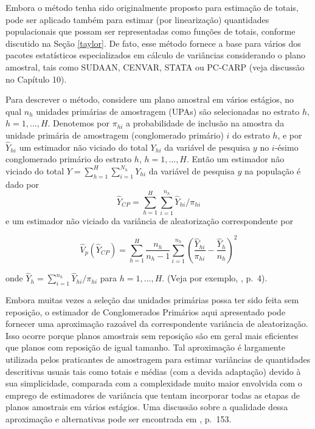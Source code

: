 \documentclass[]{book}
\theoremstyle{definition}
\theoremstyle{definition}
\theoremstyle{definition}
\theoremstyle{remark}
\begin{document}
Embora o método tenha sido originalmente proposto para estimação de
totais, pode ser aplicado também para estimar (por linearização)
quantidades populacionais que possam ser representadas como funções de
totais, conforme discutido na Seção \ref{taylor}. De fato, esse método
fornece a base para vários dos pacotes estatísticos especializados em
cálculo de variâncias considerando o plano amostral, tais como SUDAAN,
CENVAR, STATA ou PC-CARP (veja discussão no Capítulo 10).

Para descrever o método, considere um plano amostral em vários estágios,
no qual \(n_{h}\) unidades primárias de amostragem (UPAs) são
selecionadas no estrato \(h,\) \(h=1,\ldots ,H\). Denotemos por
\(\pi_{hi}\) a probabilidade de inclusão na amostra da unidade primária
de amostragem (conglomerado primário) \(i\) do estrato \(h\), e por
\(\widehat{Y}_{hi}\) um estimador não viciado do total \(Y_{hi}\) da
variável de pesquisa \(y\) no \(i\)-ésimo conglomerado primário do
estrato \(h\), \(h=1,\ldots ,H\). Então um estimador não viciado do
total \(Y=\sum_{h=1}^{H}\sum_{i=1}^{N_{h}}Y_{hi}\) da variável de
pesquisa \(y\) na população é dado por \[
\widehat{Y}_{CP}=\sum_{h=1}^{H}\sum_{i=1}^{n_{h}}\widehat{Y}_{hi}/\pi _{hi} 
\] e um estimador não viciado da variância de aleatorização
correspondente por

\begin{equation}
\widehat{V}_{p}\left( \widehat{Y}_{CP}\right) =\sum_{h=1}^{H}\frac{n_{h}}
{n_{h}-1}\sum_{i=1}^{n_{h}}\left( \frac{\widehat{Y}_{hi}}{\pi _{hi}}-
\frac{\widehat{Y}_{h}}{n_{h}}\right) ^{2}  \label{eq:estpa23}
\end{equation}

onde \(\widehat{Y}_{h}=\sum_{i=1}^{n_{h}}\widehat{Y}_{hi}/\pi _{hi}\)
para \(h=1,\ldots ,H\). (Veja por exemplo, \citep{Sudaan93}, p.~4).

Embora muitas vezes a seleção das unidades primárias possa ter sido
feita sem reposição, o estimador de Conglomerados Primários aqui
apresentado pode fornecer uma aproximação razoável da correspondente
variância de aleatorização. Isso ocorre porque planos amostrais sem
reposição são em geral mais eficientes que planos com reposição de igual
tamanho. Tal aproximação é largamente utilizada pelos praticantes de
amostragem para estimar variâncias de quantidades descritivas usuais
tais como totais e médias (com a devida adaptação) devido à sua
simplicidade, comparada com a complexidade muito maior envolvida com o
emprego de estimadores de variância que tentam incorporar todas as
etapas de planos amostrais em vários estágios. Uma discussão sobre a
qualidade dessa aproximação e alternativas pode ser encontrada em
\citep{SSW92}, p.~153.
\end{document}

